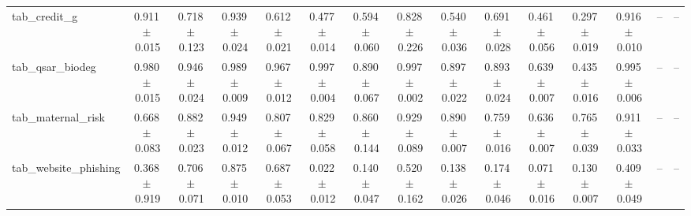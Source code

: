 \documentclass[8pt]{extarticle}
\begin{document}
\begin{longtable}{l*{14}{c}}
tab\_credit\_g & 0.911\,$\pm$\,0.015 & 0.718\,$\pm$\,0.123 & 0.939\,$\pm$\,0.024 & 0.612\,$\pm$\,0.021 & 0.477\,$\pm$\,0.014 & 0.594\,$\pm$\,0.060 & 0.828\,$\pm$\,0.226 & 0.540\,$\pm$\,0.036 & 0.691\,$\pm$\,0.028 & 0.461\,$\pm$\,0.056 & 0.297\,$\pm$\,0.019 & 0.916\,$\pm$\,0.010 & -- & -- \\
tab\_qsar\_biodeg & 0.980\,$\pm$\,0.015 & 0.946\,$\pm$\,0.024 & 0.989\,$\pm$\,0.009 & 0.967\,$\pm$\,0.012 & 0.997\,$\pm$\,0.004 & 0.890\,$\pm$\,0.067 & 0.997\,$\pm$\,0.002 & 0.897\,$\pm$\,0.022 & 0.893\,$\pm$\,0.024 & 0.639\,$\pm$\,0.007 & 0.435\,$\pm$\,0.016 & 0.995\,$\pm$\,0.006 & -- & -- \\
tab\_maternal\_risk & 0.668\,$\pm$\,0.083 & 0.882\,$\pm$\,0.023 & 0.949\,$\pm$\,0.012 & 0.807\,$\pm$\,0.067 & 0.829\,$\pm$\,0.058 & 0.860\,$\pm$\,0.144 & 0.929\,$\pm$\,0.089 & 0.890\,$\pm$\,0.007 & 0.759\,$\pm$\,0.016 & 0.636\,$\pm$\,0.007 & 0.765\,$\pm$\,0.039 & 0.911\,$\pm$\,0.033 & -- & -- \\
tab\_website\_phishing & 0.368\,$\pm$\,0.919 & 0.706\,$\pm$\,0.071 & 0.875\,$\pm$\,0.010 & 0.687\,$\pm$\,0.053 & 0.022\,$\pm$\,0.012 & 0.140\,$\pm$\,0.047 & 0.520\,$\pm$\,0.162 & 0.138\,$\pm$\,0.026 & 0.174\,$\pm$\,0.046 & 0.071\,$\pm$\,0.016 & 0.130\,$\pm$\,0.007 & 0.409\,$\pm$\,0.049 & -- & -- \\
\end{longtable}
\end{document}
